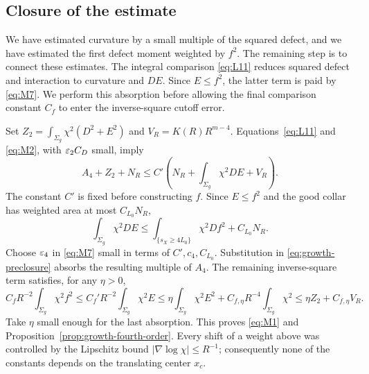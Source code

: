 \subsection{Closure of the estimate}

We have estimated curvature by a small multiple of the squared defect,
and we have estimated the first defect moment weighted by $f^2$.
The remaining step is to connect these estimates.  The integral
comparison \eqref{eq:L11} reduces squared defect and interaction to
curvature and $DE$.  Since $E\le f^2$, the latter term is paid by
\eqref{eq:M7}.  We perform this absorption before allowing the final
comparison constant $C_f$ to enter the inverse-square cutoff error.

Set $Z_2=\int_{\Sigma_g}\chi^2(D^2+E^2)$ and
$V_R=K(R)R^{m-4}$.  Equations~\eqref{eq:L11} and \eqref{eq:M2}, with
$\varepsilon_2 C_D$ small, imply
\begin{equation}\label{eq:growth-preclosure}
 A_4+Z_2+N_R
 \le C'\left(N_R+\int_{\Sigma_g}\chi^2DE+V_R\right).
\end{equation}
The constant $C'$ is fixed before constructing $f$.  Since $E\le f^2$
and the good collar has weighted area at most $C_{L_0}N_R$,
\[
 \int_{\Sigma_g}\chi^2DE
 \le\int_{\{s_X\ge4L_0\}}\chi^2Df^2+C_{L_0}N_R.
\]
Choose $\varepsilon_4$ in \eqref{eq:M7} small in terms of $C',c_4,C_{L_0}$.
Substitution in \eqref{eq:growth-preclosure} absorbs the resulting
multiple of $A_4$.  The remaining inverse-square term satisfies,
for any $\eta>0$,
\[
 C_fR^{-2}\int_{\Sigma_g}\chi^2f^2
 \le C_f'R^{-2}\int_{\Sigma_g}\chi^2E
 \le\eta\int_{\Sigma_g}\chi^2E^2
       +C_{f,\eta}R^{-4}\int_{\Sigma_g}\chi^2
 \le\eta Z_2+C_{f,\eta}V_R.
\]
Take $\eta$ small enough for the last absorption.  This proves
\eqref{eq:M1} and Proposition~\ref{prop:growth-fourth-order}.
Every shift of a weight above was controlled by the Lipschitz bound
$|\nabla\log\chi|\le R^{-1}$; consequently none of the constants
depends on the translating center $x_c$.
